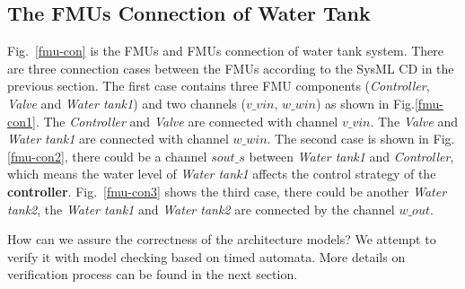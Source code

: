 \subsection{The FMUs  Connection of Water Tank}
Fig.~\ref{fmu-con} is the FMUs and FMUs connection of water tank system. There are three connection cases between the FMUs according to the SysML CD in the previous section. The first case contains three FMU components (\emph{Controller}, \emph{Valve} and \emph{Water tank1}) and two channels ($v \_ vin$, $w \_ win$) as shown in Fig.\ref{fmu-con1}. The \emph{Controller} and \emph{Valve} are connected with channel $v \_ vin$. The \emph{Valve} and \emph{Water tank1} are connected with channel $w \_ win$. The second case is shown in Fig.\ref{fmu-con2}, there could be a channel $sout \_ s$ between \emph{Water tank1} and \emph{Controller}, which means the water level of \emph{Water tank1} affects the control strategy of the \textbf{controller}. Fig.~\ref{fmu-con3} shows the third case, there could be another \emph{Water tank2}, the \emph{Water tank1} and \emph{Water tank2} are connected by the channel $w \_ out$. 
\begin{figure}[htbp]
\end{figure}
How can we assure the correctness of the architecture models? We attempt to verify it with model checking based on timed automata. More details on verification process can be found in the next section.